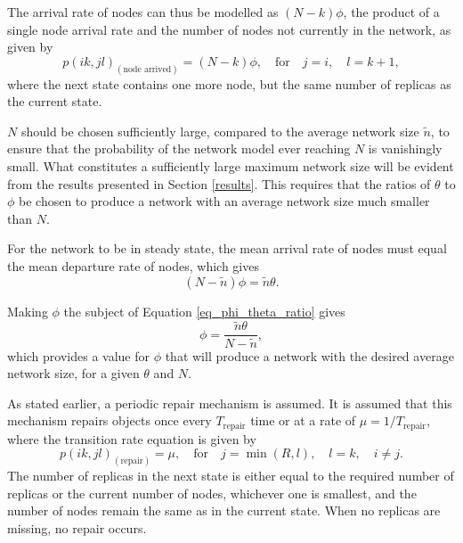 \documentclass[10pt,a4paper,conference]{IEEEtran}
\begin{document}
The arrival rate of nodes can thus be modelled as $(N - k)\phi$, the product of a single node arrival rate and the number of nodes not currently in the network, as given by
%
\begin{equation} \label{eq_node_arrived}
    p(i k,j l)_{(\textrm{node arrived})} = (N - k)\phi,\quad\textrm{for}\quad j = i,\quad l = k + 1,
\end{equation}
%
where the next state contains one more node, but the same number of replicas as the current state.


$N$ should be chosen sufficiently large, compared to the average network size $\tilde{n}$, to ensure that the probability of the network model ever reaching $N$ is vanishingly small. What constitutes a sufficiently large maximum network size will be evident from the results presented in Section \ref{results}. This requires that the ratios of $\theta$ to $\phi$ be chosen to produce a network with an average network size much smaller than $N$.

For the network to be in steady state, the mean arrival rate of nodes must equal the mean departure rate of nodes, which gives
%
\begin{equation}
    (N - \tilde{n})\phi = \tilde{n}\theta.\label{eq_phi_theta_ratio}
\end{equation}

Making $\phi$ the subject of Equation \eqref{eq_phi_theta_ratio} gives
%
\begin{equation}
    \phi = \frac{\tilde{n}\theta}{N - \tilde{n}},\label{eq_phi}
\end{equation}
%
which provides a value for $\phi$ that will produce a network with the desired average network size, for a given $\theta$ and $N$.

As stated earlier, a periodic repair mechanism is assumed. It is assumed that this mechanism repairs objects once every $T_{\textrm{repair}}$ time or at a rate of $\mu = 1/T_{\textrm{repair}}$, where the transition rate equation is given by
%
\begin{equation} \label{eq_repair}
    p(i k,j l)_{(\textrm{repair})} = \mu,\quad\textrm{for}\quad j = \min(R, l),\quad l = k,\quad i \neq j.
\end{equation}
%
The number of replicas in the next state is either equal to the required number of replicas or the current number of nodes, whichever one is smallest, and the number of nodes remain the same as in the current state. When no replicas are missing, no repair occurs.
\end{document}
